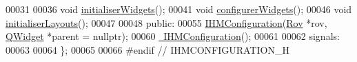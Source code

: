 \begin{DoxyCode}
00031 
00036     \textcolor{keywordtype}{void} \hyperlink{class_i_h_m_configuration_a76fe56bbd88aef5581186e05fb4ae67f}{initialiserWidgets}();
00041     \textcolor{keywordtype}{void} \hyperlink{class_i_h_m_configuration_a9ed73ca9584b8d9f33ad341081113a55}{configurerWidgets}();
00046     \textcolor{keywordtype}{void} \hyperlink{class_i_h_m_configuration_ab76abe78fff3b7945b675acddbd320f0}{initialiserLayouts}();
00047 
00048 \textcolor{keyword}{public}:
00055     \hyperlink{class_i_h_m_configuration_a1532c281d170546071352cfe05feb1b8}{IHMConfiguration}(\hyperlink{class_rov}{Rov} *rov, \hyperlink{class_q_widget}{QWidget} *parent = \textcolor{keyword}{nullptr});
00060     \hyperlink{class_i_h_m_configuration_a59e2b693b4a1f1a8a6af3227996c3808}{~IHMConfiguration}();
00061 
00062 signals:
00063 
00064 \};
00065 
00066 \textcolor{preprocessor}{#endif // IHMCONFIGURATION\_H}
\end{DoxyCode}
